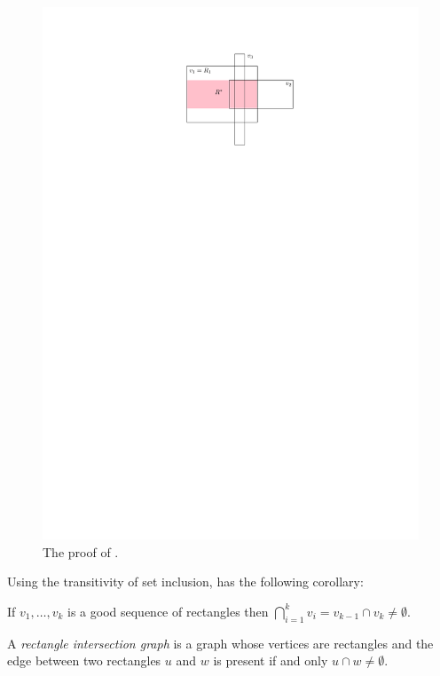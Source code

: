 \documentclass[lotsofwhite]{patmorin}
\begin{document}
\begin{figure}
  \begin{center}
    \includegraphics{figs/geometric}
  \end{center}
  \caption{The proof of .}
\end{figure}


Using the transitivity of set inclusion,  has the
following corollary:

\begin{cor}
  If $v_1,\ldots,v_k$ is a good sequence of rectangles then 
  $\bigcap_{i=1}^{k} v_i = v_{k-1}\cap v_k \neq \emptyset$.
\end{cor}

A \emph{rectangle intersection graph} is a graph whose vertices are
rectangles and the edge between two rectangles $u$ and $w$ is present
if and only $u\cap w\neq \emptyset$.
\end{document}
